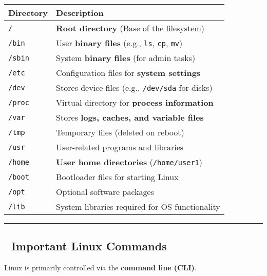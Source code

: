 \documentclass[
]{article}
\begin{document}
\begin{longtable}[]{@{}ll@{}}
\toprule\noalign{}
\textbf{Directory} & \textbf{Description} \\
\midrule\noalign{}
\endhead
\bottomrule\noalign{}
\endlastfoot
\texttt{/} & \textbf{Root directory} (Base of the filesystem) \\
\texttt{/bin} & User \textbf{binary files} (e.g., \texttt{ls},
\texttt{cp}, \texttt{mv}) \\
\texttt{/sbin} & System \textbf{binary files} (for admin tasks) \\
\texttt{/etc} & Configuration files for \textbf{system settings} \\
\texttt{/dev} & Stores device files (e.g., \texttt{/dev/sda} for
disks) \\
\texttt{/proc} & Virtual directory for \textbf{process information} \\
\texttt{/var} & Stores \textbf{logs, caches, and variable files} \\
\texttt{/tmp} & Temporary files (deleted on reboot) \\
\texttt{/usr} & User-related programs and libraries \\
\texttt{/home} & \textbf{User home directories}
(\texttt{/home/user1}) \\
\texttt{/boot} & Bootloader files for starting Linux \\
\texttt{/opt} & Optional software packages \\
\texttt{/lib} & System libraries required for OS functionality \\
\end{longtable}

\begin{center}\rule{0.5\linewidth}{0.5pt}\end{center}

\subsection{\texorpdfstring{\textbf{📌 Important Linux
Commands}}{📌 Important Linux Commands}}\label{important-linux-commands}

Linux is primarily controlled via the \textbf{command line (CLI)}.
\end{document}
